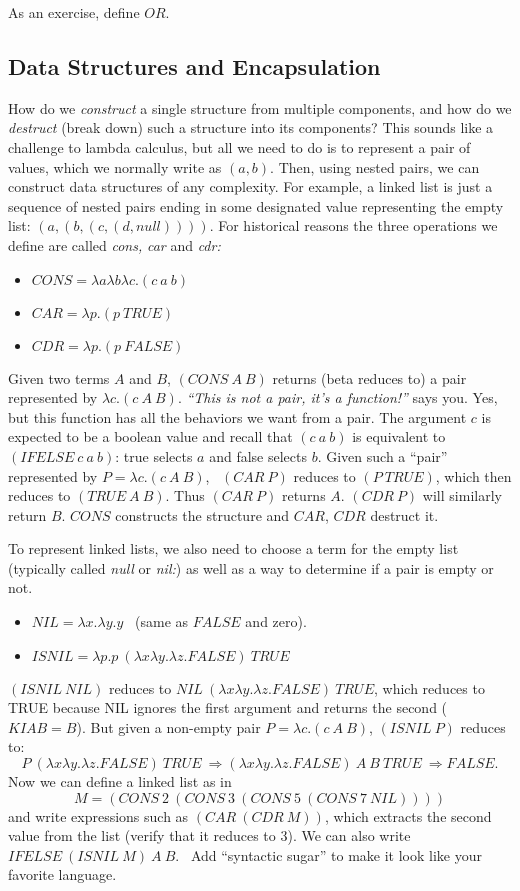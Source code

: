 As an exercise, define $OR$.


\subsection{Data Structures and Encapsulation}

How do we {\em construct\/} a single structure from multiple
components, and how do we {\em destruct\/} (break down) such a
structure into its components?  This sounds like a challenge to lambda
calculus, but all we need to do is to represent a pair of values,
which we normally write as $(a,b)$.  Then, using nested pairs, we can
construct data structures of any complexity.  For example, a linked list
is just a sequence of nested pairs ending in some designated
value representing the empty list: $(a,(b,(c,(d,null))))$.
For historical reasons the three operations we define are called {\em cons,\/}
{\em car\/} and {\em cdr:}
\begin{itemize}
\item $CONS = \lambda a\lambda b\lambda c.(c~a~b)$
\item $CAR = \lambda p.(p~TRUE)$
\item $CDR = \lambda p.(p~FALSE)$
\end{itemize}
Given two terms $A$ and $B$, $(CONS~A~B)$ returns (beta reduces to) a pair represented
by $\lambda c.(c~ A~ B)$.  {\em ``This is not a pair, it's a function!''\/}
says you.  Yes, but this function has all the behaviors we want from a pair.
The
argument $c$ is expected to be a boolean value and recall that $(c~a~b)$
is equivalent to $(IFELSE~c~a~b)$: true selects $a$ and false selects $b$.
Given such a ``pair'' represented by $P=\lambda c.(c~ A~ B)$, \ 
$(CAR~P)$ reduces to $(P~TRUE)$, which then reduces to $(TRUE~A~B)$. Thus
$(CAR~P)$ returns $A$. $(CDR~P)$ will similarly return $B$.  $CONS$ constructs
the structure and $CAR$, $CDR$ destruct it.

To represent linked lists, we also need to choose a term for the empty list
(typically called {\em null\/} or {\em nil:}) as well as a way to determine
if a pair is empty or not.
\begin{itemize}
\item $NIL = \lambda x.\lambda y.y$  \ (same as $FALSE$ and zero).
\item $ISNIL = \lambda p.p ~(\lambda x\lambda y.\lambda z.FALSE)~ TRUE$
\end{itemize}
$(ISNIL ~NIL)$ reduces to $NIL~(\lambda x\lambda y.\lambda z.FALSE)~ TRUE$,
which reduces to TRUE because NIL ignores the first argument
and returns the second ($KIAB=B$). But given a non-empty pair
$P=\lambda c.(c~A~B)$, $(ISNIL~P)$  reduces to:
$$P~(\lambda x\lambda y.\lambda z.FALSE)~TRUE ~\Rightarrow
(\lambda x\lambda y.\lambda z.FALSE)~A~B~TRUE ~\Rightarrow FALSE.$$
Now we can define a linked list as in
$$M = (CONS ~2 ~(CONS~3~(CONS~5~(CONS~ 7~ NIL))))$$
and write expressions such as $(CAR~(CDR~ M))$, which extracts the
second value from the list (verify that it reduces to 3). We can also write
$IFELSE ~(ISNIL~ M) ~A~ B$.
\ Add ``syntactic sugar'' to make it look like your favorite language.

